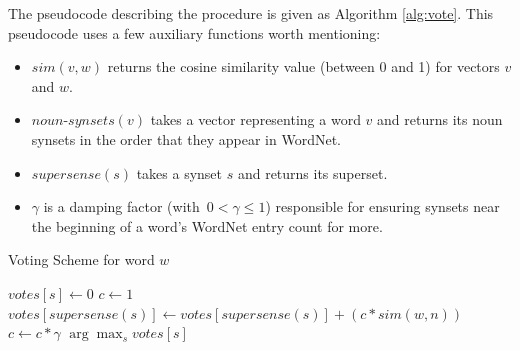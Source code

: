 \documentclass{article}
\begin{document}
\begin{enumerate}
The pseudocode describing the procedure is given as Algorithm \ref{alg:vote}.
This pseudocode uses a few auxiliary functions worth mentioning:
\begin{itemize}
\item
$sim(v,w)$ returns the cosine similarity value (between 0 and 1) for vectors $v$ and $w$.
\item
$noun$-$synsets(v)$ takes a vector representing a word $v$ and returns its noun synsets in the order that they appear in WordNet.
\item
$supersense(s)$ takes a synset $s$ and returns its superset.
\item
$\gamma$ is a damping factor (with~$0 < \gamma \leq 1$) responsible for ensuring synsets near the beginning of a word's WordNet entry count for more.
\end{itemize}
\begin{algorithm}[hbtp]
\caption{Voting Scheme for word $w$}
\label{alg:vote}
\begin{algorithmic}
\STATE $votes[s] \gets 0$
\ENDFOR
{} 
\STATE $c \gets 1$
\STATE $votes[supersense(s)] \gets votes[supersense(s)] + (c * sim(w,n))$
\STATE $c \gets c * \gamma$
\ENDFOR
\ENDFOR
\RETURN $\arg\max_s votes[s]$
\end{algorithmic}
\end{algorithm}



%

\end{enumerate}
\end{document}
